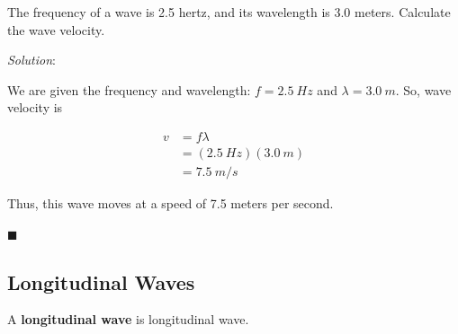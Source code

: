 \documentclass[dvipsnames]{article}
\begin{document}
\begin{example}
The frequency of a wave is 2.5 hertz, and its wavelength is 3.0 meters. Calculate the wave velocity.
\end{example}

\textit{Solution}: 

We are given the frequency and wavelength: $f = \SI{2.5}{Hz}$ and $\lambda = \SI{3.0}{m}$. So, wave velocity is

\begin{align*}
    v &= f \lambda \\[1ex]
    &= (\SI{2.5}{Hz})(\SI{3.0}{m}) \\[1ex]
    &= \boxed{\SI{7.5}{m/s}}
\end{align*}

Thus, this wave moves at a speed of 7.5 meters per second.

\hfill $\blacksquare$









\subsection{Longitudinal Waves}

A \textbf{\gls{longitudinal wave}} is \glsdesc{longitudinal wave}.

\begin{center}
\end{center}
\end{document}
